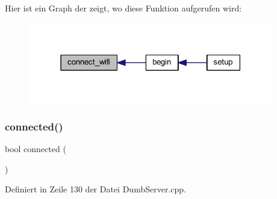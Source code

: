 Hier ist ein Graph der zeigt, wo diese Funktion aufgerufen wird\+:\nopagebreak
\begin{figure}[H]
\begin{center}
\leavevmode
\includegraphics[width=303pt]{class_esp_server_a504393c8aa6394b2d0631146425bf011_icgraph}
\end{center}
\end{figure}
\mbox{\label{class_esp_server_a59fc494d53391b27e2fd75cb750690d9}} 
\subsubsection{\texorpdfstring{connected()}{connected()}}
{\footnotesize\ttfamily bool connected (\begin{DoxyParamCaption}{ }\end{DoxyParamCaption})}



Definiert in Zeile 130 der Datei Dumb\+Server.\+cpp.


